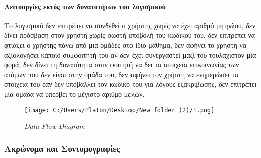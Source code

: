 \documentclass[
]{article}
\begin{document}
\hypertarget{ux3bbux3b5ux3b9ux3c4ux3bfux3c5ux3c1ux3b3ux3afux3b5ux3c2-ux3b5ux3baux3c4ux3ccux3c2-ux3c4ux3c9ux3bd-ux3b4ux3c5ux3bdux3b1ux3c4ux3bfux3c4ux3aeux3c4ux3c9ux3bd-ux3c4ux3bfux3c5-ux3bbux3bfux3b3ux3b9ux3c3ux3bcux3b9ux3baux3bfux3cd}{%
\paragraph{Λειτουργίες εκτός των δυνατοτήτων του
λογισμικού}\label{ux3bbux3b5ux3b9ux3c4ux3bfux3c5ux3c1ux3b3ux3afux3b5ux3c2-ux3b5ux3baux3c4ux3ccux3c2-ux3c4ux3c9ux3bd-ux3b4ux3c5ux3bdux3b1ux3c4ux3bfux3c4ux3aeux3c4ux3c9ux3bd-ux3c4ux3bfux3c5-ux3bbux3bfux3b3ux3b9ux3c3ux3bcux3b9ux3baux3bfux3cd}}

Το λογισμικό δεν επιτρέπει να συνδεθεί ο χρήστης χωρίς να έχει αριθμό
μητρώου, δεν δίνει πρόσβαση στον χρήστη χωρίς σωστή υποβολή του κωδικού
του, δεν επιτρέπει να φτιάξει ο χρήστης πάνω από μια ομάδες στο ίδιο
μάθημα, δεν αφήνει το χρήστη να αξιολογήσει κάποιο συμφοιτητή του αν δεν
έχει συνεργαστεί μαζί του τουλάχιστον μία φορά, δεν δίνει τη δυνατότητα
στον φοιτητή να δει τα στοιχεία επικοινωνίας των ατόμων που δεν είναι
στην ομάδα του, δεν αφήνει τον χρήστη να ενημερώσει τα στοιχεία του εάν
δεν υποβάλλει τον κωδικό του για λόγους εξακρίβωσης, δεν επιτρέπει μία
ομάδα να υπερβεί το μέγιστο αριθμό μελών.

\begin{figure}
\centering
\texttt{[image: C:/Users/Platon/Desktop/New folder (2)/1.png]}
\caption{\emph{Data Flow Diagram}}
\end{figure}

\hypertarget{ux3b1ux3baux3c1ux3ceux3bdux3c5ux3bcux3b1-ux3baux3b1ux3b9-ux3c3ux3c5ux3bdux3c4ux3bfux3bcux3bfux3b3ux3c1ux3b1ux3c6ux3afux3b5ux3c2}{%
\subsubsection{Ακρώνυμα και
Συντομογραφίες}\label{ux3b1ux3baux3c1ux3ceux3bdux3c5ux3bcux3b1-ux3baux3b1ux3b9-ux3c3ux3c5ux3bdux3c4ux3bfux3bcux3bfux3b3ux3c1ux3b1ux3c6ux3afux3b5ux3c2}}
\end{document}
